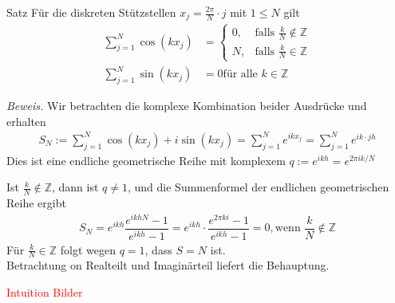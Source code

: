 \begin{colbox}{Satz}
  Für die diskreten Stützstellen $x_j=\tfrac{2\pi}{N}\cdot j$ mit $1\leq N$  gilt
  \begin{align*}
    \sum_{j=1}^N \cos(kx_j) 
    &= \begin{cases}
      0, & \text{falls } \tfrac{k}{N}\notin\mathbb{Z} \\
      N, & \text{falls } \tfrac{k}{N}\in\mathbb{Z}
    \end{cases} \\
    \sum_{j=1}^N \sin(kx_j) 
    &= 0 \text{für alle } k\in\mathbb{Z}
  \end{align*}
\end{colbox}
\textit{Beweis.}
Wir betrachten die komplexe Kombination beider Ausdrücke und erhalten
%
\begin{align*}
  S_N := \sum_{j=1}^{N} \cos(kx_j) + i\sin(kx_j) = \sum_{j=1}^{N} e^{ikx_j} = \sum_{j=1}^{N} e^{ik\cdot jh}
\end{align*}%
Dies ist eine endliche geometrische Reihe mit komplexem $q := e^{ikh} = e^{2\pi ik/N}$

Ist $\tfrac{k}{N}\notin\mathbb{Z}$, dann ist $q\neq 1$, und die Summenformel der endlichen geometrischen Reihe ergibt 
%
\begin{align*}
   S_N 
   = e^{ikh}\dfrac{e^{ikhN}-1}{e^{ikh}-1} 
   = e^{ikh}\cdot\dfrac{e^{2\pi ki}-1}{e^{ikh}-1} 
   = 0, \text{wenn } \dfrac{k}{N}\notin\mathbb{Z}
\end{align*}
%
Für $\tfrac{k}{N}\in\mathbb{Z}$ folgt wegen $q=1$, dass $S=N$ ist. \\
Betrachtung on Realteilt und Imaginärteil liefert die Behauptung.

\textcolor{red}{Intuition Bilder}

